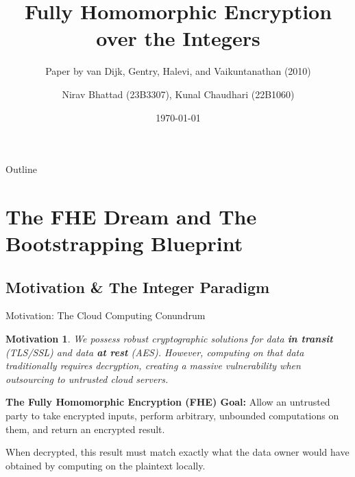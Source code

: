 \documentclass[10pt]{beamer}
\title[Fully Homomorphic Encryption over the Integers]{Fully Homomorphic Encryption over the Integers}
\subtitle{Paper by van Dijk, Gentry, Halevi, and Vaikuntanathan (2010)}
\author[Nirav, Kunal]{Nirav Bhattad (23B3307), Kunal Chaudhari (22B1060)}
\date{\today}
\newtheorem{motivation}{Motivation}
\begin{document}
\begin{frame}
    \titlepage
\end{frame}

\begin{frame}{Outline}
    \tableofcontents[hideallsubsections]
\end{frame}

\section{The FHE Dream and The Bootstrapping Blueprint}

\subsection{Motivation \& The Integer Paradigm}

\begin{frame}{Motivation: The Cloud Computing Conundrum}
    \begin{motivation}
    We possess robust cryptographic solutions for data \textbf{in transit} (TLS/SSL) and data \textbf{at rest} (AES). However, computing on that data traditionally requires decryption, creating a massive vulnerability when outsourcing to untrusted cloud servers.
    \end{motivation}
    \pause
    
    \vspace{0.3cm}
    \textbf{The Fully Homomorphic Encryption (FHE) Goal:}
    Allow an untrusted party to take encrypted inputs, perform arbitrary, unbounded computations on them, and return an encrypted result. 
    \pause
    
    \vspace{0.3cm}
    When decrypted, this result must match exactly what the data owner would have obtained by computing on the plaintext locally.
\end{frame}
\end{document}
